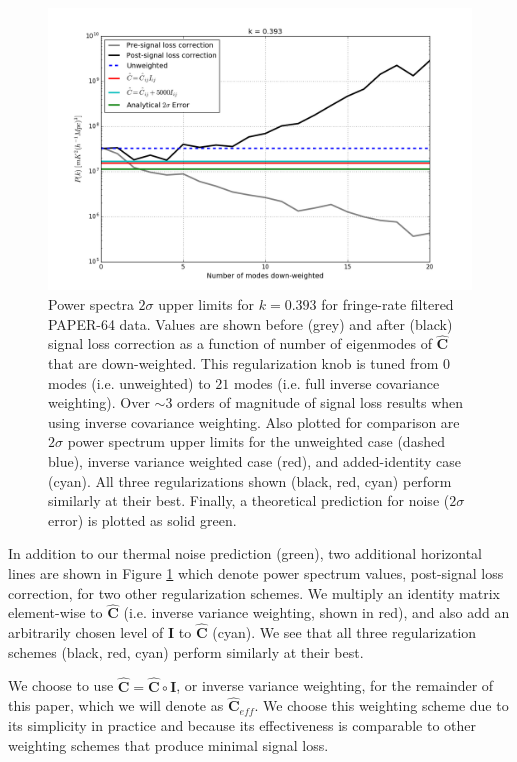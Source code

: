 \documentclass[preprint2,numberedappendix,tighten]{aastex6}  %
\begin{document}
\begin{figure}
	\centering
	\includegraphics[width=1\textwidth]{plots/sigloss_modeloop.png}
	\caption{Power spectra $2\sigma$ upper limits for $k=0.393$ for fringe-rate filtered PAPER-64 data. Values are shown before (grey) and after (black) signal loss correction as a function of number of eigenmodes of $\hat{\textbf{C}}$ that are down-weighted. This regularization knob is tuned from $0$ modes (i.e. unweighted) to $21$ modes (i.e. full inverse covariance weighting). Over $\sim3$ orders of magnitude of signal loss results when using inverse covariance weighting. Also plotted for comparison are $2\sigma$ power spectrum upper limits for the unweighted case (dashed blue), inverse variance weighted case (red), and added-identity case (cyan). All three regularizations shown (black, red, cyan) perform similarly at their best. Finally, a theoretical prediction for noise ($2\sigma$ error) is plotted as solid green.}
	\label{fig:sigloss_modeloop}
\end{figure}

In addition to our thermal noise prediction (green), two additional horizontal lines are shown in Figure \ref{fig:sigloss_modeloop} which denote power spectrum values, post-signal loss correction, for two other regularization schemes. We multiply an identity matrix element-wise to $\hat{\textbf{C}}$ (i.e. inverse variance weighting, shown in red), and also add an arbitrarily chosen level of $\textbf{I}$ to $\hat{\textbf{C}}$ (cyan). We see that all three regularization schemes (black, red, cyan) perform similarly at their best.

We choose to use $\hat{\textbf{C}} = \hat{\textbf{C}} \circ \textbf{I}$, or inverse variance weighting, for the remainder of this paper, which we will denote as $\hat{\textbf{C}}_{eff}$. We choose this weighting scheme due to its simplicity in practice and because its effectiveness is comparable to other weighting schemes that produce minimal signal loss.
\end{document}
